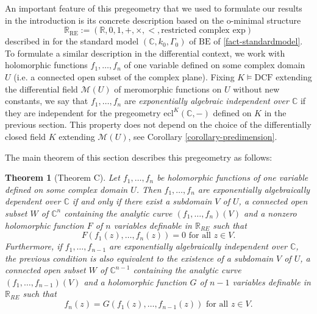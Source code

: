 \documentclass[12pt]{amsart}
\newcommand{\DCF}{\mathrm{DCF}}
\newcommand{\BE}{\mathrm{BE}}
\theoremstyle{definition}
\theoremstyle{plain}
\newtheorem{theorem}[defn]{Theorem}
\theoremstyle{exampstyle}\newtheorem{thmx}{Theorem}
\theoremstyle{exampstyle}\newtheorem{thmxbis}{Theorem}
\begin{document}
An important feature of this pregeometry that we used to formulate our results in the introduction is its concrete description based on the o-minimal structure $$\mathbb{R}_{\mathrm{RE}} := (\mathbb{R}, 0,1,+,\times, < , \text{restricted complex exp})$$
described in \cite{Kirby-alg} for the standard model $(\mathbb{C}, k_0, \Gamma_0)$ of $\BE$ of \ref{fact-standardmodel}. To formulate a similar description in the differential context, we work with holomorphic functions $f_1,\ldots, f_n$ of one variable defined on some complex domain $U$ (i.e. a connected open subset of the complex plane). Fixing $K \models \DCF$ extending the differential field $\mathcal M(U)$ of meromorphic functions on $U$ without new constants, we say that $f_1,\ldots,f_n$ are {\em exponentially algebraic independent over $\mathbb{C}$} if they are independent for the pregeometry $\mathrm{ecl}^{K}(\mathbb{C},-)$ defined on $K$ in the previous section. This property does not depend on the choice of the differentially closed field $K$ extending $\mathcal M(U)$, see Corollary \ref{corollary-predimension}. 

The main theorem of this section describes this pregeometry as follows:


\begin{theorem}[Theorem C]\label{theorem-connection-o-minimality}
Let $f_1,\ldots,f_n$ be holomorphic functions of one variable defined on some complex domain $U$. Then $f_1,\ldots,f_n$ are exponentially algebraically dependent over $\mathbb{C}$ {\em if and only if} there exist a subdomain $V$ of $U$, a connected open subset $W$ of $\mathbb{C}^n$ containing the analytic curve $(f_1,\ldots,f_n)(V)$ and a nonzero holomorphic function $F$ of $n$ variables definable in $\mathbb{R}_{RE}$ such that 
$$F(f_1(z),\ldots, f_n(z)) = 0 \text{ for all } z \in V.$$
Furthermore, if $f_1,\ldots,f_{n-1}$ are exponentially algebraically independent over $\mathbb{C}$, the previous condition is also equivalent to the existence of a subdomain $V$ of $U$, a connected open subset $W$ of $\mathbb{C}^{n-1}$ containing the analytic curve $(f_1,\ldots,f_{n-1})(V)$ and a  holomorphic function $G$ of $n-1$ variables definable in $\mathbb{R}_{RE}$ such that
$$ f_n(z) = G(f_1(z),\ldots,f_{n-1}(z)) \text{ for all } z \in V.$$  
\end{theorem} 
\end{document}
